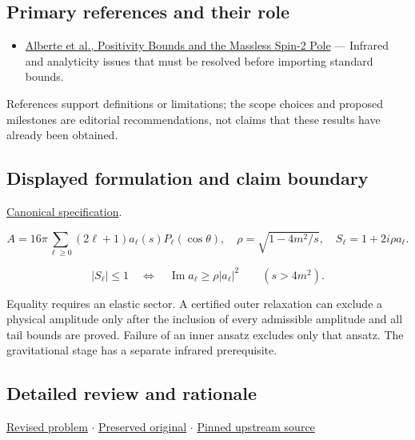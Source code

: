 \documentclass[
  11pt,
]{article}
\providecommand{\tightlist}{%
  \setlength{\itemsep}{0pt}\setlength{\parskip}{0pt}}
\begin{document}
\subsection{Primary references and their role}

\begin{itemize}
\tightlist
\item
  \href{https://arxiv.org/abs/2007.12667}{Alberte et al., Positivity
  Bounds and the Massless Spin-2 Pole} --- Infrared and analyticity
  issues that must be resolved before importing standard bounds.
\end{itemize}

References support definitions or limitations; the scope choices and
proposed milestones are editorial recommendations, not claims that these
results have already been obtained.

\subsection{Displayed formulation and claim boundary}

\href{https://github.com/rick-stevens-ai/Pure-Thought/blob/main/PRDs/06-Nonperturbative-S-matrix-Bootstrap.md}{Canonical
specification}.

\[A=16\pi\sum_{\ell\ge0}(2\ell+1)a_\ell(s)P_\ell(\cos\theta),\quad
\rho=\sqrt{1-4m^2/s},\quad S_\ell=1+2i\rho a_\ell.\]

\[|S_\ell|\le1\quad\Longleftrightarrow\quad
\operatorname{Im}a_\ell\ge\rho|a_\ell|^2\qquad(s>4m^2).\]

Equality requires an elastic sector. A certified outer relaxation can
exclude a physical amplitude only after the inclusion of every
admissible amplitude and all tail bounds are proved. Failure of an inner
ansatz excludes only that ansatz. The gravitational stage has a separate
infrared prerequisite.

\subsection{Detailed review and rationale}

\href{https://github.com/rick-stevens-ai/Pure-Thought/blob/main/PRDs/06-Nonperturbative-S-matrix-Bootstrap.md}{Revised
problem} \ensuremath{\cdot}
\href{https://github.com/rick-stevens-ai/Pure-Thought/blob/main/archive/original-PRDs/06-Nonperturbative-S-matrix-Bootstrap.md}{Preserved
original} \ensuremath{\cdot}
\href{https://github.com/rick-stevens-ai/Pure-Thought/blob/f854d4e12b55c1f5b5c2a964b75f2d23496d981e/PRDs/06-Nonperturbative-S-matrix-Bootstrap.md}{Pinned
upstream source}
\end{document}
